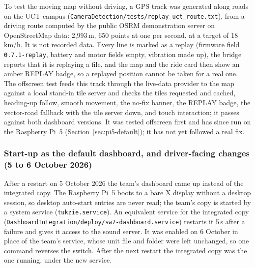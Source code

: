 To test the moving map without driving, a GPS track was generated along roads on the UCT campus (\texttt{CameraDetection/tests/replay\_uct\_route.txt}), from a driving route computed by the public OSRM demonstration server on OpenStreetMap data: 2,993\,m, 650 points at one per second, at a target of 18\,km/h. It is not recorded data. Every line is marked as a replay (firmware field \texttt{0.7.1-replay}, battery and motor fields empty, vibration made up), the bridge reports that it is replaying a file, and the map and the ride card then show an amber REPLAY badge, so a replayed position cannot be taken for a real one. The offscreen test feeds this track through the live-data provider to the map against a local stand-in tile server and checks the tiles requested and cached, heading-up follow, smooth movement, the no-fix banner, the REPLAY badge, the vector-road fallback with the tile server down, and touch interaction; it passes against both dashboard versions. It was tested offscreen first and has since run on the Raspberry Pi~5 (Section~\ref{sec:pi5-default}); it has not yet followed a real fix.

\subsubsection*{Start-up as the default dashboard, and driver-facing changes (5 to 6 October 2026)}
\label{sec:pi5-default}
After a restart on 5 October 2026 the team's dashboard came up instead of the integrated copy. The Raspberry Pi~5 boots to a bare X display without a desktop session, so desktop auto-start entries are never read; the team's copy is started by a system service (\texttt{tukzie.service}). An equivalent service for the integrated copy (\texttt{DashboardIntegration/deploy/sw7-dashboard.service}) restarts it 5\,s after a failure and gives it access to the sound server. It was enabled on 6 October in place of the team's service, whose unit file and folder were left unchanged, so one command reverses the switch. After the next restart the integrated copy was the one running, under the new service.

